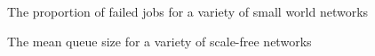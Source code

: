 \begin{figure}[h] 
  \centering
  \caption{The proportion of failed jobs for a variety of small world networks}
  \label{FIG:RES:SWPROPFAILED}
\end{figure}

\begin{figure}[h] 
  \centering
  \caption{The mean queue size for a variety of scale-free networks}
  \label{FIG:RES:SFQSIZE}
\end{figure}

